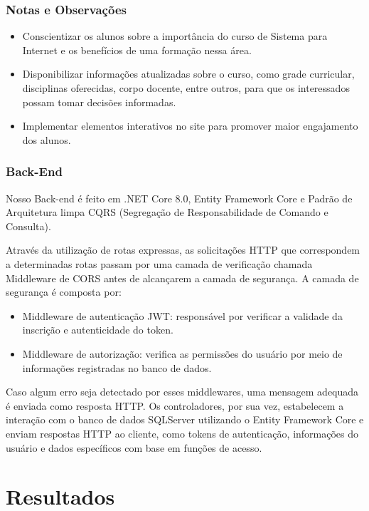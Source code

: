 \documentclass[a4paper,12pt]{report}
\begin{document}
\subsection{Notas e Observações} 
  
\begin{itemize} 
  \item Conscientizar os alunos sobre a importância do curso de Sistema para Internet e os benefícios de uma formação nessa área. 
  \item Disponibilizar informações atualizadas sobre o curso, como grade curricular, disciplinas oferecidas, corpo docente, entre outros, para que os interessados possam tomar decisões informadas. 
  \item Implementar elementos interativos no site para promover maior engajamento dos alunos. 
\end{itemize} 

\subsection{Back-End} 
Nosso Back-end é feito em .NET Core 8.0, Entity Framework Core e Padrão de Arquitetura limpa CQRS (Segregação de Responsabilidade de Comando e Consulta).
  
Através da utilização de rotas expressas, as solicitações HTTP que correspondem a determinadas rotas passam por uma camada de verificação chamada Middleware de CORS antes de alcançarem a camada de segurança. 
A camada de segurança é composta por: 
\begin{itemize} 
  \item Middleware de autenticação JWT: responsável por verificar a validade da inscrição e autenticidade do token. 
  \item Middleware de autorização: verifica as permissões do usuário por meio de informações registradas no banco de dados. 
\end{itemize} 
Caso algum erro seja detectado por esses middlewares, uma mensagem adequada é enviada como resposta HTTP. 
Os controladores, por sua vez, estabelecem a interação com o banco de dados SQLServer utilizando o Entity Framework Core e enviam respostas HTTP ao cliente, como tokens de autenticação, informações do usuário e dados específicos com base em funções de acesso. 

\chapter{Resultados}
\end{document}

